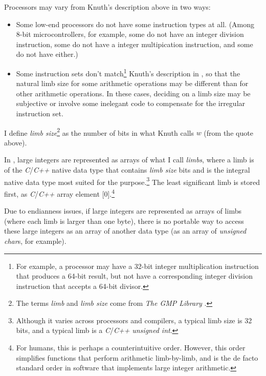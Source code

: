 Processors may vary from Knuth's description above in two ways:

\begin{itemize}
\item Some low-end processors do not have some instruction
      types at all.  (Among 8-bit microcontrollers, for 
      example, some do not have an integer division
      instruction, some do not have a integer multipication
      instruction, and
      some do not have either.)
\item Some instruction sets don't match\footnote{For
      example, a processor may have a 32-bit integer 
      multiplication instruction that produces a
      64-bit result, but not have a corresponding integer
      division instruction
      that accepts a 64-bit divisor.} Knuth's description
      in \cite[pp.
      265-266]{bibref:b:TaocpVolume2}, so that the natural
      limb size for some
      arithmetic operations may be different than for other
      arithmetic
      operations.  In these cases, deciding on a limb size
      may be subjective or
      involve some inelegant code to compensate for the
      irregular instruction
      set.
\end{itemize}

I define \emph{limb size}\footnote{The terms \emph{limb} 
and \emph{limb size} come from \emph{The GMP Library} 
\cite{bibref:w:gmplibhomepage}.} as the number of bits in 
what Knuth calls $w$ (from the quote above).  

In \emph{\productbasenameshort{}}, large integers are 
represented as arrays of what I call \emph{limbs}, where a 
limb is of the \emph{C}/\emph{C++} native data type that 
contains \emph{limb size} bits and is the integral native 
data type most suited for the purpose.\footnote{Although it 
varies across processors and compilers, a typical limb size 
is 32 bits, and a typical limb is a \emph{C}/\emph{C++} 
\emph{unsigned int}.} The least significant limb is stored 
first, as \emph{C}/\emph{C++} array element 
[0].\footnote{For humans, this is perhaps a counterintuitive 
order.  However, this order simplifies functions that 
perform arithmetic limb-by-limb, and is the de facto 
standard order in software that implements large integer 
arithmetic.} 

Due to endianness issues, if large integers are represented 
as arrays of limbs (where each limb is larger than one 
byte), there is no portable way to access these large 
integers as an array of another data type (as an array of 
\emph{unsigned char}s, for example).  


